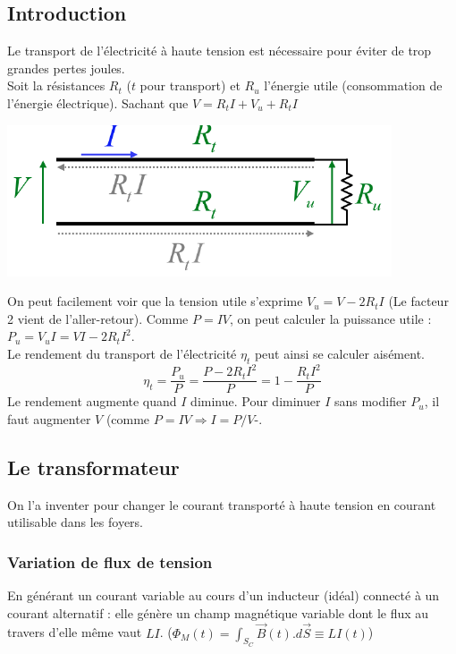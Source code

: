 \documentclass	[11pt, a4paper, openany]{book}
\begin{document}
\subsection{Introduction}
Le transport de l'électricité à haute tension est nécessaire pour éviter de trop grandes pertes joules.\\
Soit la résistances $R_t$ ($t$ pour transport) et $R_u$ l'énergie utile (consommation de l'énergie électrique). Sachant que $V = R_tI + V_u + R_tI$

\begin{center}
\includegraphics[scale=0.45]{em/image25.png}\\
\end{center}
On peut facilement voir que la tension utile s'exprime $V_u = V - 2 R_tI$ (Le facteur 2 vient de l'aller-retour). Comme $P = IV$, on peut calculer la puissance utile : $P_u = V_uI = VI - 2R_tI^2$.\\
Le rendement du transport de l'électricité $\eta_t$ peut ainsi se calculer aisément.
\begin{equation}
\eta_t = \frac{P_u}{P} = \frac{P - 2R_tI^2}{P} = 1 - \frac{R_tI^2}{P}
\end{equation}
Le rendement augmente quand $I$ diminue. Pour diminuer $I$ sans modifier $P_u$, il faut augmenter $V$ (comme $P = IV \Rightarrow I = P/V$-.

\subsection{Le transformateur}
On l'a inventer pour changer le courant transporté à haute tension en courant utilisable dans les foyers.

\subsubsection{Variation de flux de tension}
En générant un courant variable au cours d'un inducteur (idéal) connecté à un courant alternatif : elle génère un champ magnétique variable dont le flux au travers d'elle même vaut $LI$. ($\Phi_M(t) = \int_{S_C} \vec{B}(t).d\vec{S} \equiv LI(t)$)\\
\end{document}
